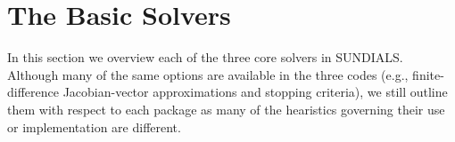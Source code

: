 \section{The Basic Solvers}\label{s:basic_solvers}

In this section we overview each of the three core solvers in SUNDIALS.
Although many of the same options are available in the three codes 
(e.g., finite-difference Jacobian-vector approximations 
and stopping criteria), we still outline them with respect to each package
as many of the hearistics governing their use or 
implementation are different.

